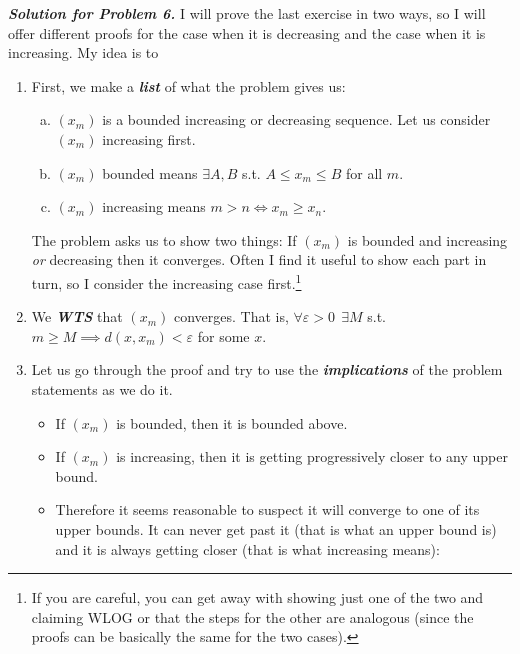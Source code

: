 \documentclass{article}
\begin{document}
\textbf{\textit{Solution for Problem 6.}} I will prove the last exercise in two ways, so I will offer different proofs for the case when it is decreasing and the case when it is increasing. My idea is to 
\begin{enumerate}
  \item First, we make a \textbf{\textit{list}} of what the problem gives us:
    \begin{enumerate}[a)]
      \item $(x_m)$ is a bounded increasing or decreasing sequence.  Let us consider $(x_m)$ increasing first.
        \label{item:ps1_pp6_bound_mono}

      \item $(x_m)$ bounded means $\exists A, B$ s.t. $A \le x_m \le B$ for all $m$.
        \label{item:ps1_pp6_bound}

      \item $(x_m)$ increasing means $m > n \iff x_m \ge x_n$.
        \label{item:ps1_pp6_increasing}
    \end{enumerate}

    The problem asks us to show two things: If $(x_m)$ is bounded and increasing \textit{or} decreasing then it converges. Often I find it useful to show each part in turn, so I consider the increasing case first.\footnote{If you are careful, you can get away with showing just one of the two and claiming WLOG or that the steps for the other are analogous (since the proofs can be basically the same for the two cases).}
      \label{item:ps1_pp6_list}

  \item We \textit{\textbf{WTS}} that $(x_m)$ converges. That is, $\forall \varepsilon > 0 ~~ \exists M$ s.t. $m \ge M \implies d(x, x_m) < \varepsilon$ for some $x$.

  \item Let us go through the proof and try to use the \textit{\textbf{implications}} of the problem statements as we do it.
    \begin{itemize}[label=$\circ$]
      \item If $(x_m)$ is bounded, then it is bounded above.

      \item If $(x_m)$ is increasing, then it is getting progressively closer to any upper bound.

      \item Therefore it seems reasonable to suspect it will converge to one of its upper bounds. It can never get past it (that is what an upper bound is) and it is always getting closer (that is what increasing means):
        \begin{figure}[H]
          \centering
\end{figure}
\end{itemize}
\end{enumerate}
\end{document}
